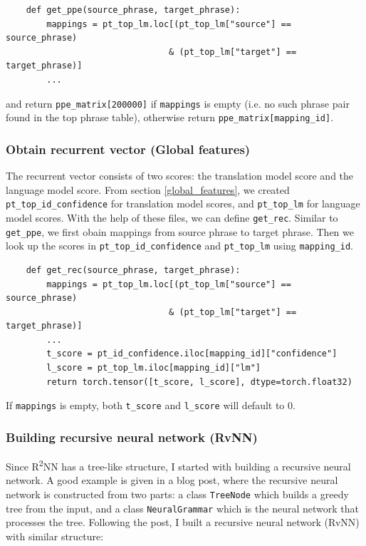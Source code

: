 \documentclass[12pt,a4paper,twoside,openright]{report}
\begin{document}
\begin{verbatim}
    def get_ppe(source_phrase, target_phrase):
        mappings = pt_top_lm.loc[(pt_top_lm["source"] == source_phrase) 
                                & (pt_top_lm["target"] == target_phrase)]
        ...
\end{verbatim}

and return \texttt{ppe\_matrix[200000]} if \texttt{mappings} is empty (i.e. no such phrase pair found in the top phrase table), otherwise return \texttt{ppe\_matrix[mapping\_id]}.

\subsubsection{Obtain recurrent vector (Global features)}
The recurrent vector consists of two scores: the translation model score and the language model score. From section \ref{global_features}, we created \texttt{pt\_top\_id\_confidence} for translation model scores, and \texttt{pt\_top\_lm} for language model scores. With the help of these files, we can define \texttt{get\_rec}. Similar to \texttt{get\_ppe}, we first obain mappings from source phrase to target phrase. Then we look up the scores in \texttt{pt\_top\_id\_confidence} and \texttt{pt\_top\_lm} using \texttt{mapping\_id}.

\begin{verbatim}
    def get_rec(source_phrase, target_phrase):
        mappings = pt_top_lm.loc[(pt_top_lm["source"] == source_phrase) 
                                & (pt_top_lm["target"] == target_phrase)]
        ...
        t_score = pt_id_confidence.iloc[mapping_id]["confidence"]
        l_score = pt_top_lm.iloc[mapping_id]["lm"]
        return torch.tensor([t_score, l_score], dtype=torch.float32)
\end{verbatim}

If \texttt{mappings} is empty, both \texttt{t\_score} and \texttt{l\_score} will default to 0.

\subsubsection{Building recursive neural network (RvNN)}
Since R\textsuperscript{2}NN has a tree-like structure, I started with building a recursive neural network. A good example is given in a blog post\cite{rvnn_daniel}, where the recursive neural network is constructed from two parts: a class \texttt{TreeNode} which builds a greedy tree from the input, and a class \texttt{NeuralGrammar} which is the neural network that processes the tree. Following the post, I built a recursive neural network (RvNN) with similar structure:
\end{document}
